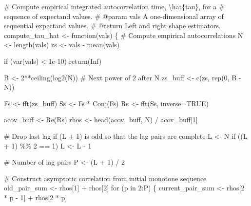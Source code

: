 \documentclass[
  letterpaper,
  DIV=11,
  numbers=noendperiod]{scrartcl}
\newenvironment{Shaded}{\begin{snugshade}}{\end{snugshade}}
\newcommand{\CommentTok}[1]{\textcolor[rgb]{0.37,0.37,0.37}{#1}}
\newcommand{\ControlFlowTok}[1]{\textcolor[rgb]{0.00,0.23,0.31}{#1}}
\newcommand{\DecValTok}[1]{\textcolor[rgb]{0.68,0.00,0.00}{#1}}
\newcommand{\FloatTok}[1]{\textcolor[rgb]{0.68,0.00,0.00}{#1}}
\newcommand{\KeywordTok}[1]{\textcolor[rgb]{0.00,0.23,0.31}{#1}}
\newcommand{\NormalTok}[1]{\textcolor[rgb]{0.00,0.23,0.31}{#1}}
\newcommand{\OperatorTok}[1]{\textcolor[rgb]{0.37,0.37,0.37}{#1}}
\begin{document}
\begin{Shaded}
\begin{Highlighting}[]
\CommentTok{\# Compute empirical integrated autocorrelation time, \textbackslash{}hat\{tau\}, for a}
\CommentTok{\# sequence of expectand values.}
\CommentTok{\# @param vals A one{-}dimensional array of sequential expectand values.}
\CommentTok{\# @return Left and right shape estimators.}
\NormalTok{compute\_tau\_hat }\OperatorTok{\textless{}{-}}\NormalTok{ function(vals) \{}
  \CommentTok{\# Compute empirical autocorrelations}
\NormalTok{  N }\OperatorTok{\textless{}{-}}\NormalTok{ length(vals)}
\NormalTok{  zs }\OperatorTok{\textless{}{-}}\NormalTok{ vals }\OperatorTok{{-}}\NormalTok{ mean(vals)}
  
  \ControlFlowTok{if}\NormalTok{ (var(vals) }\OperatorTok{\textless{}} \FloatTok{1e{-}10}\NormalTok{)}
    \ControlFlowTok{return}\NormalTok{(Inf)}

\NormalTok{  B }\OperatorTok{\textless{}{-}} \DecValTok{2}\OperatorTok{**}\NormalTok{ceiling(log2(N)) }\CommentTok{\# Next power of 2 after N}
\NormalTok{  zs\_buff }\OperatorTok{\textless{}{-}}\NormalTok{ c(zs, rep(}\DecValTok{0}\NormalTok{, B }\OperatorTok{{-}}\NormalTok{ N))}

\NormalTok{  Fs }\OperatorTok{\textless{}{-}}\NormalTok{ fft(zs\_buff)}
\NormalTok{  Ss }\OperatorTok{\textless{}{-}}\NormalTok{ Fs }\OperatorTok{*}\NormalTok{ Conj(Fs)}
\NormalTok{  Rs }\OperatorTok{\textless{}{-}}\NormalTok{ fft(Ss, inverse}\OperatorTok{=}\NormalTok{TRUE)}

\NormalTok{  acov\_buff }\OperatorTok{\textless{}{-}}\NormalTok{ Re(Rs)}
\NormalTok{  rhos }\OperatorTok{\textless{}{-}}\NormalTok{ head(acov\_buff, N) }\OperatorTok{/}\NormalTok{ acov\_buff[}\DecValTok{1}\NormalTok{]}

  \CommentTok{\# Drop last lag if (L + 1) is odd so that the lag pairs are complete}
\NormalTok{  L }\OperatorTok{\textless{}{-}}\NormalTok{ N}
  \ControlFlowTok{if}\NormalTok{ ((L }\OperatorTok{+} \DecValTok{1}\NormalTok{) }\OperatorTok{\%\%} \DecValTok{2} \OperatorTok{==} \DecValTok{1}\NormalTok{)}
\NormalTok{    L }\OperatorTok{\textless{}{-}}\NormalTok{ L }\OperatorTok{{-}} \DecValTok{1}

  \CommentTok{\# Number of lag pairs}
\NormalTok{  P }\OperatorTok{\textless{}{-}}\NormalTok{ (L }\OperatorTok{+} \DecValTok{1}\NormalTok{) }\OperatorTok{/} \DecValTok{2}

  \CommentTok{\# Construct asymptotic correlation from initial monotone sequence}
\NormalTok{  old\_pair\_sum }\OperatorTok{\textless{}{-}}\NormalTok{ rhos[}\DecValTok{1}\NormalTok{] }\OperatorTok{+}\NormalTok{ rhos[}\DecValTok{2}\NormalTok{]}
  \ControlFlowTok{for}\NormalTok{ (p }\KeywordTok{in} \DecValTok{2}\NormalTok{:P) \{}
\NormalTok{    current\_pair\_sum }\OperatorTok{\textless{}{-}}\NormalTok{ rhos[}\DecValTok{2} \OperatorTok{*}\NormalTok{ p }\OperatorTok{{-}} \DecValTok{1}\NormalTok{] }\OperatorTok{+}\NormalTok{ rhos[}\DecValTok{2} \OperatorTok{*}\NormalTok{ p]}
  

\end{Highlighting}
\end{Shaded}
\end{document}
